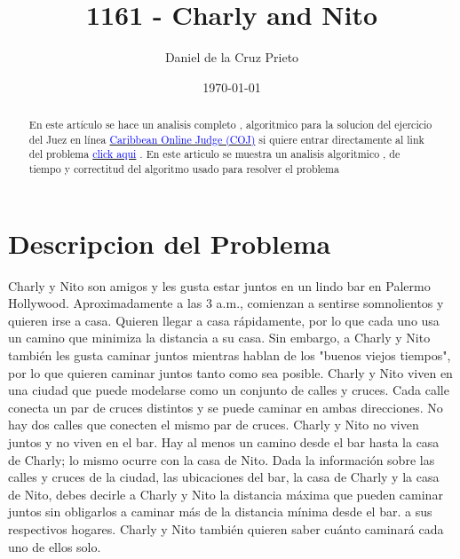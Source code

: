 \documentclass{article}
\begin{document}
    \title{1161 - Charly and Nito} 
    \author{Daniel de la Cruz Prieto} 
    \date{\today} 
    \maketitle

    \begin{abstract}
        \noindent En este art\'iculo se hace un analisis completo , algoritmico para la solucion del ejercicio 
        del Juez en l\'inea \href{https://coj.uci.cu}{\textcolor{blue}{Caribbean Online Judge (COJ)}} si quiere entrar directamente al link del 
        problema \href{https://coj.uci.cu/24h/problem.xhtml?pid=1161}{\textcolor{blue}{click aqui}}   . En este articulo se muestra un analisis algoritmico , de tiempo y correctitud del 
        algoritmo usado para resolver el problema 
    \end{abstract}


    \section*{Descripcion del Problema } 

    \begin{flushleft}
    Charly y Nito son amigos y les gusta estar juntos en un lindo bar en 
    Palermo Hollywood. Aproximadamente a las 3 a.m., comienzan a
    sentirse somnolientos y quieren irse a casa.
    Quieren llegar a casa r\'apidamente, por lo que cada uno usa 
    un camino que minimiza la distancia a su casa. Sin embargo,
    a Charly y Nito también les gusta caminar juntos mientras 
    hablan de los "buenos viejos tiempos", por lo que quieren 
    caminar juntos tanto como sea posible. Charly y Nito viven 
    en una ciudad que puede modelarse como un conjunto de 
    calles y cruces. Cada calle conecta un par de cruces 
    distintos y se puede caminar en ambas direcciones. 
    No hay dos calles que conecten el mismo par de cruces. 
    Charly y Nito no viven juntos y no viven en el bar. 
    Hay al menos un camino desde el bar hasta la casa de Charly; 
    lo mismo ocurre con la casa de Nito. 
    Dada la información sobre las calles y cruces de la ciudad, 
    las ubicaciones del bar, la casa de Charly y la casa de Nito,
    debes decirle a Charly y Nito la distancia m\'axima que pueden 
    caminar juntos sin obligarlos a caminar m\'as de la 
    distancia m\'inima desde el bar. a sus respectivos hogares.
    Charly y Nito tambi\'en quieren saber cu\'anto caminar\'a 
    cada uno de ellos solo.
    \end{flushleft}
\end{document}
